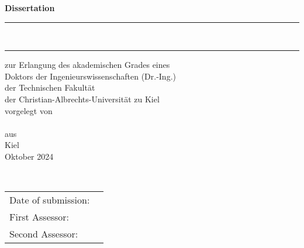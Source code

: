 \begin{center}
	\fontsize{16}{18}\selectfont
	{\textbf{\huge Dissertation}} \\
	\vspace{2cm}
	\hrule
	\vspace{0.4cm}
	\textbf{\Large \MAtitle}\\
	\vspace{0.3cm}
	\hrule
	\vspace{2cm}
	{\large zur Erlangung des akademischen Grades eines \\ Doktors der Ingenieurswissenschaften (Dr.-Ing.) \\ der Technischen Fakultät \\ der Christian-Albrechts-Universität zu Kiel} \\
	\vspace{2cm}	
          {\small vorgelegt von} \\
	\vspace{0.2cm}		
	\large{\Author} \\
	\vspace{1cm}
         {\small aus} \\
	\vspace{0.2cm}
	{\large Kiel} \\
	\vspace{2cm}	
	{\large Oktober 2024} \\
	\vspace{1cm}
	\vspace{1cm}
	
	
\end{center}
\newpage

\ \vfill
\begin{tabularx}{0.9\textwidth}{l l}
	Date of submission: & \DateOfSubmission \\
	First Assessor: &\CorrectorA \\
	Second Assessor: & \CorrectorB \\
\end{tabularx}	
\newpage
